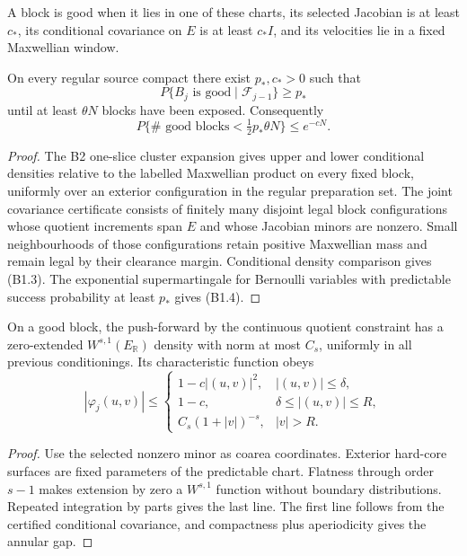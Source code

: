 A block is good when it lies in one of these charts, its selected Jacobian is
at least $c_*$, its conditional covariance on $E$ is at least $c_*I$, and its
velocities lie in a fixed Maxwellian window.

\begin{lemma}
\label{lem:r27-b1-good}
On every regular source compact there exist $p_*,c_*>0$ such that
\[
 P\{B_j\text{ is good}\mid\mathcal F_{j-1}\}\ge p_*       \tag{B1.3}
\]
until at least $\theta N$ blocks have been exposed.  Consequently
\[
 P\{\#\text{ good blocks}<\tfrac12p_*\theta N\}
 \le e^{-cN}.                                             \tag{B1.4}
\]
\end{lemma}

\begin{proof}
The B2 one-slice cluster expansion gives upper and lower conditional
densities relative to the labelled Maxwellian product on every fixed block,
uniformly over an exterior configuration in the regular preparation set.
The joint covariance certificate consists of finitely many disjoint legal
block configurations whose quotient increments span $E$ and whose Jacobian
minors are nonzero.  Small neighbourhoods of those configurations retain
positive Maxwellian mass and remain legal by their clearance margin.
Conditional density comparison gives (B1.3).  The exponential
supermartingale for Bernoulli variables with predictable success probability
at least $p_*$ gives (B1.4).
\end{proof}

\begin{lemma}
\label{lem:r27-b1-density}
On a good block, the push-forward by the continuous quotient constraint has a
zero-extended $W^{s,1}(E_{\mathbb R})$ density with norm at most $C_s$,
uniformly in all previous conditionings.  Its characteristic function obeys
\[
 |\varphi_j(u,v)|\le
 \begin{cases}
 1-c|(u,v)|^2,&|(u,v)|\le\delta,\\
 1-c,&\delta\le|(u,v)|\le R,\\
 C_s(1+|v|)^{-s},&|v|>R.
 \end{cases}                                             \tag{B1.5}
\]
\end{lemma}

\begin{proof}
Use the selected nonzero minor as coarea coordinates.  Exterior hard-core
surfaces are fixed parameters of the predictable chart.  Flatness through
order $s-1$ makes extension by zero a $W^{s,1}$ function without boundary
distributions.  Repeated integration by parts gives the last line.  The first
line follows from the certified conditional covariance, and compactness plus
aperiodicity gives the annular gap.
\end{proof}

